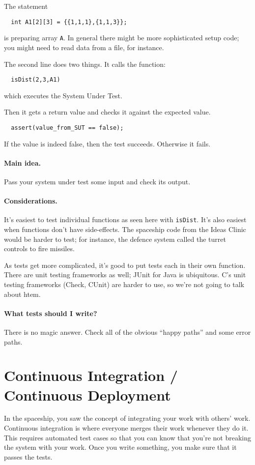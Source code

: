 \documentclass[11pt]{article}
\begin{document}
The statement
\begin{lstlisting}
  int A1[2][3] = {{1,1,1},{1,1,3}};
\end{lstlisting}
is preparing array {\tt A}. In general there might be more sophisticated setup code; you might
need to read data from a file, for instance.

\newpage
The second line does two things. It calls the function:
\begin{lstlisting}
  isDist(2,3,A1)
\end{lstlisting}
which executes the System Under Test.

Then it gets a return value and checks it against the expected value.
\begin{lstlisting}
  assert(value_from_SUT == false);
\end{lstlisting}
If the value is indeed false, then the test succeeds. Otherwise it fails.

\paragraph{Main idea.} Pass your system under test some input and check its output.

\paragraph{Considerations.} It's easiest to test individual functions
as seen here with {\tt isDist}. It's also easiest when functions don't
have side-effects. The spaceship code from the Ideas Clinic would be
harder to test; for instance, the defence system called the turret
controls to fire missiles.

As tests get more complicated, it's good to put tests each in their
own function. There are unit testing frameworks as well; JUnit for
Java is ubiquitous. C's unit testing frameworks (Check, CUnit)
are harder to use, so we're not going to talk about htem.

\paragraph{What tests should I write?} There is no magic answer.
Check all of the obvious ``happy paths'' and some error paths.

\section*{Continuous Integration / Continuous Deployment}
In the spaceship, you saw the concept of integrating your work with
others' work. Continuous integration is where everyone merges their
work whenever they do it. This requires automated test cases so that
you can know that you're not breaking the system with your work. Once
you write something, you make sure that it passes the tests.
\end{document}
